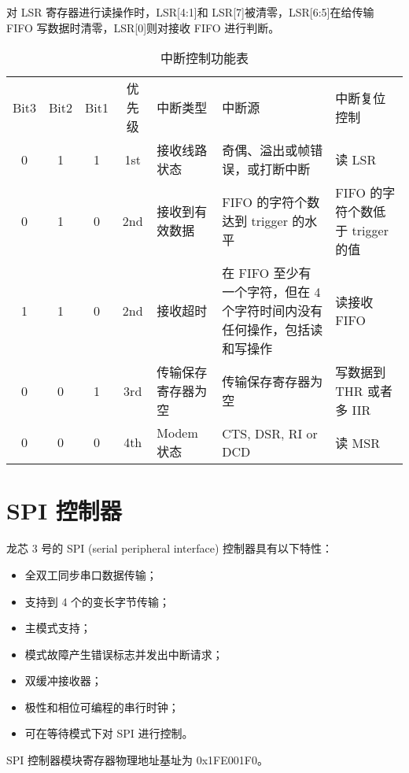 对 LSR 寄存器进行读操作时，LSR[4:1]和 LSR[7]被清零，LSR[6:5]在给传输 FIFO
写数据时清零，LSR[0]则对接收 FIFO 进行判断。

\begin{longtable}{|c|c|c|c|p{3cm}|p{4cm}|p{3cm}|}
  \caption{中断控制功能表} \label{tab:LPCInt} \\

  \hline Bit3 & Bit2 & Bit1 & 优先级 &  中断类型 & 中断源 & 中断复位控制 \\ \hhline
  \endhead
  \endfoot \endlastfoot

  0  &   1   &   1   &  1st   &  接收线路状态 &
  奇偶、溢出或帧错误，或打断中断     & 读 LSR \\ \hline

  0  &   1   &   0   &  2nd   &  接收到有效数据     &
  FIFO 的字符个数达到 trigger 的水平 & FIFO 的字符个数低于 trigger 的值 \\
  \hline

  1  &   1   &   0   &  2nd   &  接收超时 &
  在 FIFO 至少有一个字符，但在 4 个字符时间内没有任何操作，包括读和写操作 &
  读接收 FIFO \\ \hline

  0  &   0   &   1   &  3rd   &  传输保存寄存器为空 &
  传输保存寄存器为空 & 写数据到 THR 或者多 IIR \\ \hline

  0  &   0   &   0   &  4th   &  Modem 状态 &
  CTS, DSR, RI or DCD & 读 MSR \\ \hline
\end{longtable}

\section{SPI 控制器}

龙芯 3 号的 SPI (serial peripheral interface) 控制器具有以下特性：
\begin{itemize}
  \item 全双工同步串口数据传输；
  \item 支持到 4 个的变长字节传输；
  \item 主模式支持；
  \item 模式故障产生错误标志并发出中断请求；
  \item 双缓冲接收器；
  \item 极性和相位可编程的串行时钟；
  \item 可在等待模式下对 SPI 进行控制。
\end{itemize}

SPI 控制器模块寄存器物理地址基址为 0x1FE001F0。

